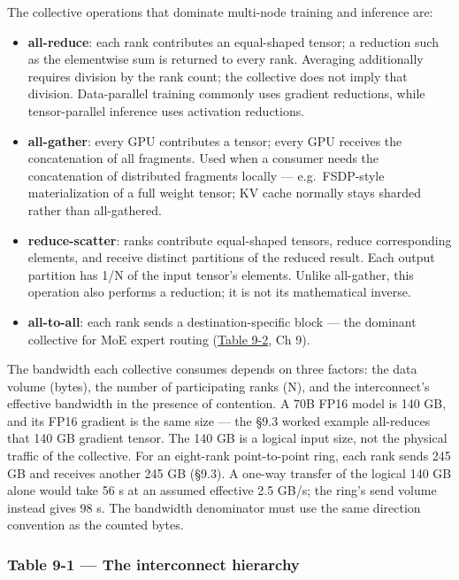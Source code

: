 The collective operations that dominate multi-node training and
inference are:

\begin{itemize}
\tightlist
\item
  \textbf{all-reduce}: each rank contributes an equal-shaped tensor; a
  reduction such as the elementwise sum is returned to every rank.
  Averaging additionally requires division by the rank count; the
  collective does not imply that division. Data-parallel training
  commonly uses gradient reductions, while tensor-parallel inference
  uses activation reductions.
\item
  \textbf{all-gather}: every GPU contributes a tensor; every GPU
  receives the concatenation of all fragments. Used when a consumer
  needs the concatenation of distributed fragments locally ---
  e.g.~FSDP-style materialization of a full weight tensor; KV cache
  normally stays sharded rather than all-gathered.
\item
  \textbf{reduce-scatter}: ranks contribute equal-shaped tensors, reduce
  corresponding elements, and receive distinct partitions of the reduced
  result. Each output partition has 1/N of the input tensor's elements.
  Unlike all-gather, this operation also performs a reduction; it is not
  its mathematical inverse.
\item
  \textbf{all-to-all}: each rank sends a destination-specific block ---
  the dominant collective for MoE expert routing (\hyperref[tab:9.2]{Table 9-2}, Ch 9).
\end{itemize}

The bandwidth each collective consumes depends on three factors: the
data volume (bytes), the number of participating ranks (N), and the
interconnect's effective bandwidth in the presence of contention. A 70B
FP16 model is 140 GB, and its FP16 gradient is the same size --- the
§9.3 worked example all-reduces that 140 GB gradient tensor. The 140 GB
is a logical input size, not the physical traffic of the collective. For
an eight-rank point-to-point ring, each rank sends 245 GB and receives
another 245 GB (§9.3). A one-way transfer of the logical 140 GB alone
would take 56 s at an assumed effective 2.5 GB/s; the ring's send volume
instead gives 98 s. The bandwidth denominator must use the same
direction convention as the counted bytes.

\subsubsection{Table 9-1 --- The interconnect
hierarchy}\label{table-9-1-the-interconnect-hierarchy}

